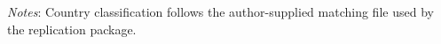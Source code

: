 \begin{table}[htbp]
\begin{tabular}{p{}p{}}
\hline
\end{tabular}
\vspace{0.5em}
\parbox{0.95\textwidth}{\footnotesize \textit{Notes}: Country classification follows the author-supplied matching file used by the replication package.}
\end{table}
